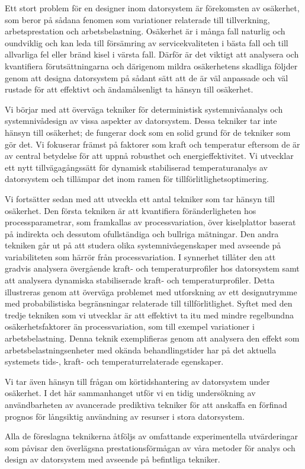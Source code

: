 Ett stort problem för en designer inom datorsystem är förekomsten av osäkerhet,
som beror på sådana fenomen som variationer relaterade till tillverkning,
arbetsprestation och arbetsbelastning. Osäkerhet är i många fall naturlig och
oundviklig och kan leda till försämring av servicekvaliteten i bästa fall och
till allvarliga fel eller bränd kisel i värsta fall. Därför är det viktigt att
analysera och kvantifiera förutsättningarna och därigenom mildra osäkerhetens
skadliga följder genom att designa datorsystem på sådant sätt att de är väl
anpassade och väl rustade för att effektivt och ändamålsenligt ta hänsyn till
osäkerhet.

Vi börjar med att överväga tekniker för deterministisk systemnivåanalys och
systemnivådesign av vissa aspekter av datorsystem. Dessa tekniker tar inte
hänsyn till osäkerhet; de fungerar dock som en solid grund för de tekniker som
gör det. Vi fokuserar främst på faktorer som kraft och temperatur eftersom de är
av central betydelse för att uppnå robusthet och energieffektivitet. Vi
utvecklar ett nytt tillvägagångssätt för dynamisk stabiliserad temperaturanalys
av datorsystem och tillämpar det inom ramen för tillförlitlighetsoptimering.

Vi fortsätter sedan med att utveckla ett antal tekniker som tar hänsyn till
osäkerhet. Den första tekniken är att kvantifiera föränderligheten hos
processparametrar, som framkallas av processvariation, över kiselplattor baserat
på indirekta och dessutom ofullständiga och bullriga mätningar. Den andra
tekniken går ut på att studera olika systemnivåegenskaper med avseende på
variabiliteten som härrör från processvariation. I synnerhet tillåter den att
gradvis analysera övergående kraft- och temperaturprofiler hos datorsystem samt
att analysera dynamiska stabiliserade kraft- och temperaturprofiler. Detta
illustreras genom att överväga problemet med utforskning av ett designutrymme
med probabilistiska begränsningar relaterade till tillförlitlighet. Syftet med
den tredje tekniken som vi utvecklar är att effektivt ta itu med mindre
regelbundna osäkerhetsfaktorer än processvariation, som till exempel variationer
i arbetsbelastning. Denna teknik exemplifieras genom att analysera den effekt
som arbetsbelastningsenheter med okända behandlingstider har på det aktuella
systemets tids-, kraft- och temperaturrelaterade egenskaper.

Vi tar även hänsyn till frågan om körtidshantering av datorsystem under
osäkerhet. I det här sammanhanget utför vi en tidig undersökning av
användbarheten av avancerade prediktiva tekniker för att anskaffa en förfinad
prognos för långsiktig användning av resurser i stora datorsystem.

Alla de föreslagna teknikerna åtföljs av omfattande experimentella utvärderingar
som påvisar den överlägsna prestationsförmågan av våra metoder för analys och
design av datorsystem med avseende på befintliga tekniker.

